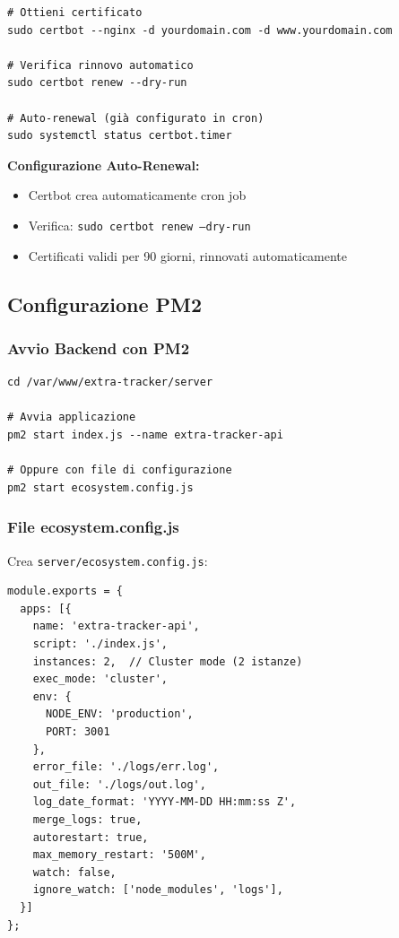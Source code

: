 \documentclass[11pt,a4paper]{article}
\newcommand{\code}[1]{\texttt{#1}}
\begin{document}
\begin{lstlisting}[caption=Ottenere Certificato SSL]
# Ottieni certificato
sudo certbot --nginx -d yourdomain.com -d www.yourdomain.com

# Verifica rinnovo automatico
sudo certbot renew --dry-run

# Auto-renewal (già configurato in cron)
sudo systemctl status certbot.timer
\end{lstlisting}

\textbf{Configurazione Auto-Renewal:}
\begin{itemize}
    \item Certbot crea automaticamente cron job
    \item Verifica: \code{sudo certbot renew --dry-run}
    \item Certificati validi per 90 giorni, rinnovati automaticamente
\end{itemize}

\subsection{Configurazione PM2}

\subsubsection{Avvio Backend con PM2}

\begin{lstlisting}[caption=Configurazione PM2]
cd /var/www/extra-tracker/server

# Avvia applicazione
pm2 start index.js --name extra-tracker-api

# Oppure con file di configurazione
pm2 start ecosystem.config.js
\end{lstlisting}

\subsubsection{File ecosystem.config.js}

Crea \code{server/ecosystem.config.js}:

\begin{lstlisting}[caption=ecosystem.config.js]
module.exports = {
  apps: [{
    name: 'extra-tracker-api',
    script: './index.js',
    instances: 2,  // Cluster mode (2 istanze)
    exec_mode: 'cluster',
    env: {
      NODE_ENV: 'production',
      PORT: 3001
    },
    error_file: './logs/err.log',
    out_file: './logs/out.log',
    log_date_format: 'YYYY-MM-DD HH:mm:ss Z',
    merge_logs: true,
    autorestart: true,
    max_memory_restart: '500M',
    watch: false,
    ignore_watch: ['node_modules', 'logs'],
  }]
};
\end{lstlisting}
\end{document}
